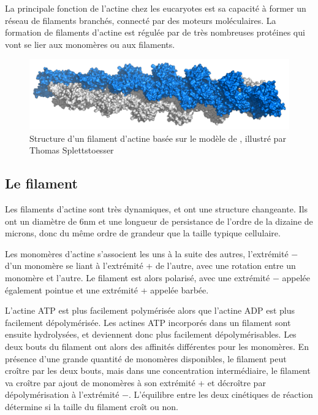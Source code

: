 La principale fonction de l'actine chez les eucaryotes est sa capacité à former un réseau de filaments branchés, connecté par des moteurs moléculaires. 
La formation de filaments d'actine est régulée par de très nombreuses protéines qui vont se lier aux monomères ou aux filaments. 

\begin{figure}
\includegraphics[scale=0.3]{Actin_filament_atomic_model.png}
\caption{Structure d'un filament d'actine basée sur le modèle de \cite{holmes_atomic_1990}, illustré par Thomas Splettstoesser}
\end{figure}

\subsection{Le filament}

Les filaments d'actine sont très dynamiques, et ont une structure changeante. Ils ont un diamètre de 6nm et une longueur de persistance de l'ordre de la dizaine de microns, donc du même ordre de grandeur que la taille typique cellulaire. 

Les monomères d'actine s'associent les uns à la suite des autres, l'extrémité $-$ d'un monomère se liant à l'extrémité + de l'autre, avec une rotation entre un monomère et l'autre. 
Le filament est alors polarisé, avec une extrémité $-$ appelée également pointue et une extrémité + appelée barbée. 

L'actine ATP est plus facilement polymérisée alors que l'actine ADP est plus facilement dépolymérisée. 
Les actines ATP incorporés dans un filament sont ensuite hydrolysées, et deviennent donc plus facilement dépolymérisables.
Les deux bouts du filament ont alors des affinités différentes pour les monomères. En présence d'une grande quantité de monomères disponibles, le filament peut croître par les deux bouts, mais dans une concentration intermédiaire, le filament va croître par ajout de monomères à son extrémité + et décroître par dépolymérisation à l'extrémité $-$. L'équilibre entre les deux cinétiques de réaction détermine si la taille du filament croît ou non. 

